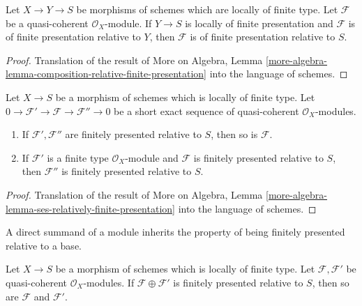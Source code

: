 \begin{lemma}
\label{lemma-composition-relative-finite-presentation}
Let $X \to Y \to S$ be morphisms of schemes which are locally of finite
type. Let $\mathcal{F}$ be a quasi-coherent $\mathcal{O}_X$-module.
If $Y \to S$ is locally of finite presentation and $\mathcal{F}$
is of finite presentation relative to $Y$, then $\mathcal{F}$
is of finite presentation relative to $S$.
\end{lemma}

\begin{proof}
Translation of the result of
More on Algebra, Lemma
\ref{more-algebra-lemma-composition-relative-finite-presentation}
into the language of schemes.
\end{proof}

\begin{lemma}
\label{lemma-ses-relatively-finite-presentation}
Let $X \to S$ be a morphism of schemes which is locally of finite type.
Let $0 \to \mathcal{F}' \to \mathcal{F} \to \mathcal{F}'' \to 0$
be a short exact sequence of quasi-coherent $\mathcal{O}_X$-modules.
\begin{enumerate}
\item If $\mathcal{F}', \mathcal{F}''$ are finitely presented relative to
$S$, then so is $\mathcal{F}$.
\item If $\mathcal{F}'$ is a finite type $\mathcal{O}_X$-module
and $\mathcal{F}$ is finitely presented relative to $S$, then
$\mathcal{F}''$ is finitely presented relative to $S$.
\end{enumerate}
\end{lemma}

\begin{proof}
Translation of the result of
More on Algebra, Lemma
\ref{more-algebra-lemma-ses-relatively-finite-presentation}
into the language of schemes.
\end{proof}

\begin{lemma}
\label{lemma-sum-relatively-finite-presentation}
\begin{slogan}
A direct summand of a module inherits the property of being finitely
presented relative to a base.
\end{slogan}
Let $X \to S$ be a morphism of schemes which is locally of finite type.
Let $\mathcal{F}, \mathcal{F}'$ be quasi-coherent $\mathcal{O}_X$-modules.
If $\mathcal{F} \oplus \mathcal{F}'$ is finitely presented relative to $S$,
then so are $\mathcal{F}$ and $\mathcal{F}'$.
\end{lemma}

